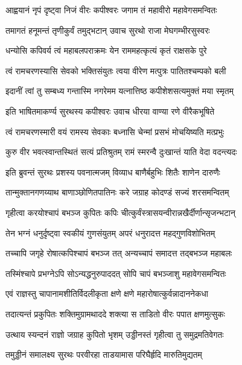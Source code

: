\twolineshloka
{आह्वयानं नृपं दृष्ट्वा निजं वीरः कपीश्वरः}
{जगाम तं महावीरो महावेगसमन्वितः}%

\twolineshloka
{तमागतं हनूमन्तं तृणीकुर्वं तमुद्भटान्}
{उवाच सुरथो राजा मेघगम्भीरसुस्वरः}%


\twolineshloka
{धन्योसि कपिवर्य त्वं महाबलपराक्रमः}
{येन राममहत्कृत्यं कृतं राक्षसके पुरे}%

\twolineshloka
{त्वं रामचरणस्यासि सेवको भक्तिसंयुतः}
{त्वया वीरेण मत्पुत्रः पातितश्चम्पको बली}%

\twolineshloka
{इदानीं त्वां तु सम्बध्य गन्तास्मि नगरेमम}
{यत्नात्तिष्ठ कपीशेशसत्यमुक्तं मया स्मृतम्}%

\twolineshloka
{इति भाषितमाकर्ण्य सुरथस्य कपीश्वरः}
{उवाच धीरया वाण्या रणे वीरैकभूषिते}%


\twolineshloka
{त्वं रामचरणस्मारी वयं रामस्य सेवकाः}
{बध्नासि चेन्मां प्रसभं मोचयिष्यति मत्प्रभुः}%

\twolineshloka
{कुरु वीर भवत्स्वान्तस्थितं सत्यं प्रतिश्रुतम्}
{रामं स्मरन्वै दुःखान्तं याति वेदा वदन्त्यदः}%


\twolineshloka
{इति ब्रुवन्तं सुरथः प्रशस्य पवनात्मजम्}
{विव्याध बाणैर्बहुभिः शितैः शाणेन दारुणैः}%

\twolineshloka
{तान्मुक्तानगणय्याथ बाणाञ्छोणितपातिनः}
{करे जग्राह कोदण्डं सज्यं शरसमन्वितम्}%

\twolineshloka
{गृहीत्वा करयोश्चापं बभञ्ज कुपितः कपिः}
{चीत्कुर्वंस्त्रासयन्वीरान्नखैर्दीर्णान्सृजन्भटान्}%

\twolineshloka
{तेन भग्नं धनुर्दृष्ट्वा स्वकीयं गुणसंयुतम्}
{अपरं धनुरादत्त महद्गुणविशोभितम्}%

\twolineshloka
{तच्चापि जगृहे रोषात्कपिश्चापं बभञ्ज तत्}
{अन्यच्चापं समादत्त तद्बभञ्ज महाबलः}%

\twolineshloka
{तस्मिंश्चापे प्रभग्नेऽपि सोऽन्यद्धनुरुपाददत्}
{सोपि चापं बभञ्जाशु महावेगसमन्वितः}%

\twolineshloka
{एवं राज्ञस्तु चापानामशीतिर्विदलीकृता}
{क्षणे क्षणे महारोषात्कुर्वन्नादाननेकधा}%

\twolineshloka
{तदात्यन्तं प्रकुपितः शक्तिमुग्रामथाददे}
{शक्त्या स ताडितो वीरः पपात क्षणमुत्सुकः}%

\twolineshloka
{उत्थाय स्यन्दनं राज्ञो जग्राह कुपितो भृशम्}
{उड्डीनस्तं गृहीत्वा तु समुद्रमतिवेगतः}%

\twolineshloka
{तमुड्डीनं समालक्ष्य सुरथः परवीरहा}
{ताडयामास परिघैर्हृदि मारुतिमुद्यतम्}%

